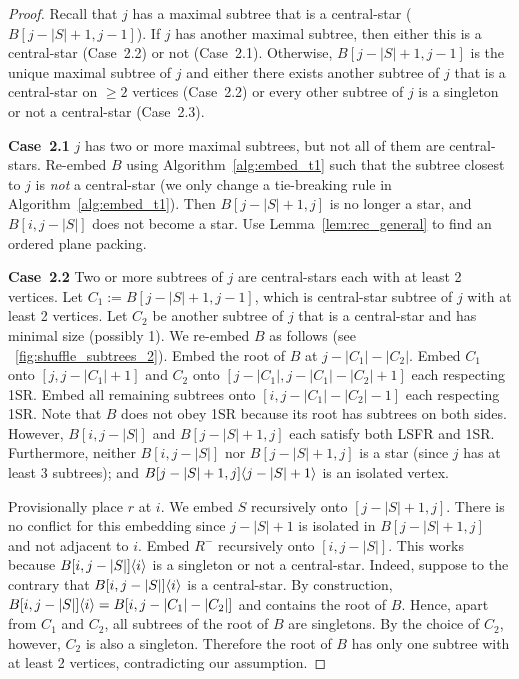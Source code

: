\documentclass[11pt,a4paper,colorlinks=true,urlcolor=blue,citecolor=red]{article}
\theoremstyle{plain}
\newcommand{\case}[1]{\par\vspace{.5\baselineskip}\noindent\textbf{\sffamily Case~#1}}
\begin{document}
\begin{proof}
  Recall that $j$ has a maximal subtree that is a central-star
  ($B[j-|S|+1,j-1]$). If $j$ has another maximal subtree, then either
  this is a central-star (Case~2.2) or not (Case~2.1). Otherwise,
  $B[j-|S|+1,j-1]$ is the unique maximal subtree of $j$ and either there
  exists another subtree of $j$ that is a central-star on $\ge 2$
  vertices (Case~2.2) or every other subtree of $j$ is a singleton or
  not a central-star (Case~2.3).

  \case{2.1} $j$ has two or more maximal subtrees, but not all of them
  are central-stars. Re-embed $B$ using Algorithm~\ref{alg:embed_t1}
  such that the subtree closest to $j$ is \emph{not} a central-star (we
  only change a tie-breaking rule in Algorithm~\ref{alg:embed_t1}). Then
  $B[j-|S|+1,j]$ is no longer a star, and $B[i,j-|S|]$ does not become a
  star. Use Lemma~\ref{lem:rec_general} to find an ordered plane
  packing.

  \case{2.2} Two or more subtrees of $j$ are central-stars each with at
  least 2 vertices. Let $C_1:=B[j-|S|+1,j-1]$, which is central-star
  subtree of $j$ with at least 2 vertices. Let $C_2$ be another subtree
  of $j$ that is a central-star and has minimal size (possibly 1). We
  re-embed $B$ as follows (see
  \figurename~\ref{fig:shuffle_subtrees_2}). Embed the root of $B$ at
  $j-|C_1|-|C_2|$. Embed $C_1$ onto $[j,j-|C_1|+1]$ and $C_2$ onto
  $[j-|C_1|,j-|C_1|-|C_2|+1]$ each respecting 1SR. Embed all
  remaining subtrees onto $[i,j-|C_1|-|C_2|-1]$ each respecting 1SR.
  Note that $B$ does not obey 1SR because its root has subtrees on both
  sides. However, $B[i,j-|S|]$ and $B[j-|S|+1,j]$ each satisfy both LSFR
  and 1SR. Furthermore, neither $B[i,j-|S|]$ nor $B[j-|S|+1,j]$ is a
  star (since $j$ has at least 3 subtrees); and
  $B{[j-|S|+1,j]}\langle{j-|S|+1}\rangle$ is an isolated vertex.

  Provisionally place $r$ at $i$. We embed $S$ recursively onto
  $[j-|S|+1,j]$. There is no conflict for this embedding since $j-|S|+1$
  is isolated in $B[j-|S|+1,j]$ and not adjacent to $i$. Embed $R^-$
  recursively onto $[i,j-|S|]$. This works because
  $B{[i,j-|S|]}\langle{i}\rangle$ is a singleton or not a central-star. Indeed,
  suppose to the contrary that $B{[i,j-|S|]}\langle{i}\rangle$ is a
  central-star. By construction,
  $B{[i,j-|S|]}\langle{i}\rangle=B[i,j-|C_1|-|C_2|]$ and contains the root of
  $B$. Hence, apart from $C_1$ and $C_2$, all subtrees of the root of
  $B$ are singletons. By the choice of $C_2$, however, $C_2$ is also a
  singleton. Therefore the root of $B$ has only one subtree with at
  least 2 vertices, contradicting our assumption.


\end{proof}
\end{document}
